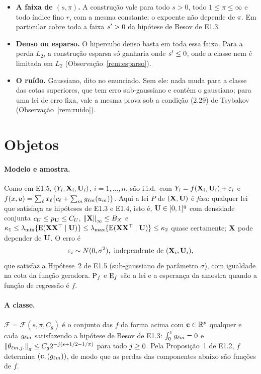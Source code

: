 \documentclass[11pt,a4paper]{article}
\newcommand{\lmin}{\lambda_{\min}}
\newcommand{\lmaxx}{\lambda_{\max}}
\newcommand{\Fcal}{\mathcal{F}}
\begin{document}
\begin{itemize}[leftmargin=*, nosep]
  \item \textbf{A faixa de $(s,\pi)$.} A construção vale para todo $s > 0$,
    todo $1 \le \pi \le \infty$ e todo índice fino $r$, com a mesma constante;
    o expoente não depende de $\pi$. Em particular cobre toda a faixa
    $s' > 0$ da hipótese de Besov de E1.3.
  \item \textbf{Denso ou esparso.} O hipercubo denso basta em toda essa
    faixa. Para a perda $L_{2}$, a construção esparsa só ganharia onde
    $s' \le 0$, onde a classe nem é limitada em $L_{2}$
    (Observação~\ref{rem:esparso}).
  \item \textbf{O ruído.} Gaussiano, dito no enunciado. Sem ele: nada muda
    para a classe das cotas superiores, que tem erro sub-gaussiano e contém
    o gaussiano; para uma lei de erro fixa, vale a mesma prova sob a condição
    (2.29) de Tsybakov (Observação~\ref{rem:ruido}).
\end{itemize}

\section{Objetos}

\paragraph{Modelo e amostra.} Como em E1.5, $(Y_{i},\mathbf{X}_{i},\mathbf{U}_{i})$,
$i = 1,\dots,n$, são i.i.d.\ com $Y_{i} = f(\mathbf{X}_{i},\mathbf{U}_{i}) +
\varepsilon_{i}$ e $f(x,u) = \sum_{\ell}x_{\ell}\{c_{\ell} +
\sum_{m}g_{\ell m}(u_{m})\}$. Aqui a lei $P$ de $(\mathbf{X},\mathbf{U})$ é
\emph{fixa}: qualquer lei que satisfaça as hipóteses de E1.3 e E1.4, isto é,
$\mathbf{U} \in [0,1]^{q}$ com densidade conjunta $c_{U} \le p_{\mathbf{U}} \le C_{U}$,
$\left\lVert \mathbf{X} \right\rVert_{\infty} \le B_{X}$ e $\kappa_{1} \le
\lmin\{\E(\bX\bX\T\mid\bU)\} \le \lmaxx\{\E(\bX\bX\T\mid\bU)\} \le \kappa_{2}$
quase certamente; $\mathbf{X}$ pode depender de $\mathbf{U}$. O erro é
\begin{equation}
  \label{eq:gauss}
  \varepsilon_{i} \sim N(0,\sigma^{2}),\ \text{independente de }
  (\mathbf{X}_{i},\mathbf{U}_{i}),
\end{equation}
que satisfaz a Hipótese~2 de E1.5 (sub-gaussiano de parâmetro $\sigma$), com
igualdade na cota da função geradora. $\mathrm{P}_{f}$ e $\mathrm{E}_{f}$ são a lei e a
esperança da amostra quando a função de regressão é $f$.

\paragraph{A classe.} $\Fcal = \Fcal(s,\pi,C_{g})$ é o conjunto das $f$ da
forma acima com $\mathbf{c} \in \mathbb{R}^{p}$ qualquer e cada $g_{\ell m}$ satisfazendo
a hipótese de Besov de E1.3: $\int_{0}^{1}g_{\ell m} = 0$ e
$\left\lVert \theta_{\ell m,j\cdot} \right\rVert_{\pi} \le C_{g}2^{-j(s+1/2-1/\pi)}$ para
todo $j \ge 0$. Pela Proposição~1 de E1.2, $f$ determina $(\mathbf{c},
(g_{\ell m}))$, de modo que as perdas das componentes abaixo são
funções de $f$.
\end{document}
